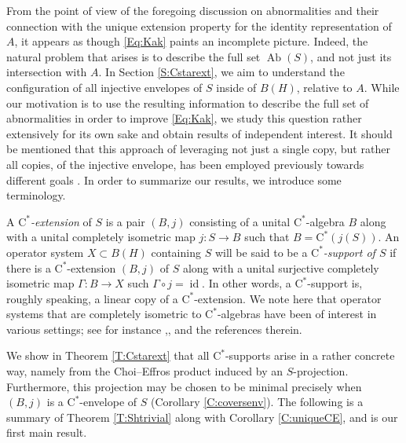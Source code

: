 \documentclass[10pt]{amsart}
\newcommand{\rC}{\mathrm{C}}
\newcommand{\Ab}{\operatorname{Ab}}
\newcommand{\id}{\operatorname{id}}
\theoremstyle{definition}
\begin{document}
 
 From the point of view of the foregoing discussion on abnormalities and their connection with the unique extension property for the identity representation of $A$, it appears as though \eqref{Eq:Kak} paints an incomplete picture. Indeed, the natural problem that arises is to describe the full set $\Ab(S)$, and not just its intersection with $A$. In Section \ref{S:Cstarext}, we aim to understand the configuration of all injective envelopes of $S$ inside of $B(H)$, relative to $A$.  While our motivation is to use the resulting information to describe the full set of abnormalities in order to improve \eqref{Eq:Kak}, we study this question rather extensively for its own sake and obtain results of independent interest. It should be mentioned that this approach of leveraging not just a single copy, but rather all copies, of the injective envelope, has been employed previously towards different goals \cite{paulsen2011}. In order to summarize our results, we introduce some terminology. 

A \emph{$\rC^*$-extension} of $S$ is a pair $(B,j)$ consisting of a unital $\rC^*$-algebra $B$ along with a unital completely isometric map $j:S\to B$ such that $B=\rC^*(j(S))$.  An operator system $X\subset B(H)$ containing $S$ will be said to be a \emph{$\rC^*$-support of $S$} if there is a $\rC^*$-extension $(B,j)$ of $S$ along with a unital surjective completely isometric map  $\Gamma:B\to X$ such $\Gamma\circ j=\id$. In other words, a $\rC^*$-support is, roughly speaking, a linear copy of a $\rC^*$-extension. We note here that operator systems that are completely isometric to $\rC^*$-algebras have been of interest in various settings; see for instance \cite{KW1998},\cite{CW2025},\cite{courtney2025} and the references therein.
 
We show in Theorem \ref{T:Cstarext} that all $\rC^*$-supports arise in a rather concrete way, namely from the Choi--Effros product induced by an $S$-projection. Furthermore, this projection may be chosen to be minimal precisely when $(B,j)$ is a $\rC^*$-envelope of $S$ (Corollary \ref{C:coversenv}).
The following is a summary of Theorem  \ref{T:Shtrivial} along with Corollary \ref{C:uniqueCE}, and is our first main result.
\end{document}
